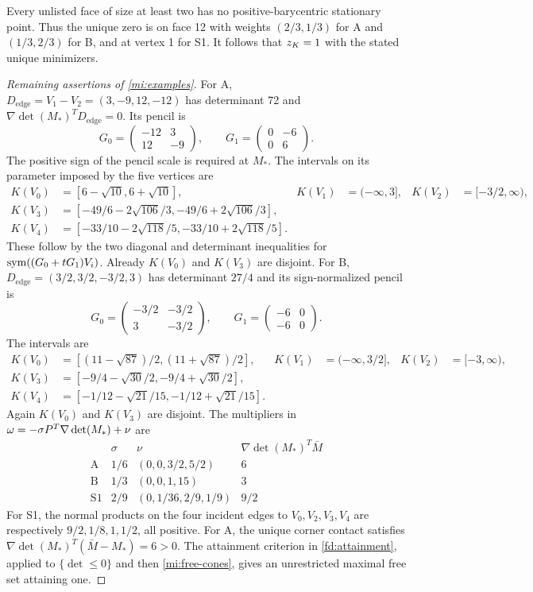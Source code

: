Every unlisted face of size at least two has no positive-barycentric
stationary point. Thus the unique zero is on face 12 with weights
$(2/3,1/3)$ for A and $(1/3,2/3)$ for B, and at vertex 1 for S1.
It follows that $z_K=1$ with the stated unique minimizers.

\begin{proof}[Remaining assertions of \cref{mi:examples}]\label{mi:example-proof}
For A, $D_{\mathrm{edge}}=V_1-V_2=(3,-9,12,-12)$ has determinant 72 and
$\nabla\det(M_*)^TD_{\mathrm{edge}}=0$. Its pencil is
\[
 G_0=\begin{pmatrix}-12&3\\12&-9\end{pmatrix},\qquad
 G_1=\begin{pmatrix}0&-6\\0&6\end{pmatrix}.
\]
The positive sign of the pencil scale is required at $M_*$.
The intervals on its parameter imposed by the five vertices are
\begin{align*}
 K(V_0)&=[6-\sqrt{10},6+\sqrt{10}],&
 K(V_1)&=(-\infty,3],&K(V_2)&=[-3/2,\infty),\\
 K(V_3)&=[-49/6-2\sqrt{106}/3,-49/6+2\sqrt{106}/3],\\
 K(V_4)&=[-33/10-2\sqrt{118}/5,-33/10+2\sqrt{118}/5].
\end{align*}
These follow by the two diagonal and determinant inequalities for
$\operatorname{sym}((G_0+tG_1)V_i)$. Already $K(V_0)$ and $K(V_3)$ are disjoint.
For B, $D_{\mathrm{edge}}=(3/2,3/2,-3/2,3)$ has determinant $27/4$ and its sign-normalized
pencil is
\[
 G_0=\begin{pmatrix}-3/2&-3/2\\3&-3/2\end{pmatrix},\qquad
 G_1=\begin{pmatrix}-6&0\\-6&0\end{pmatrix}.
\]
The intervals are
\begin{align*}
 K(V_0)&=[(11-\sqrt{87})/2,(11+\sqrt{87})/2],&
 K(V_1)&=(-\infty,3/2],&K(V_2)&=[-3,\infty),\\
 K(V_3)&=[-9/4-\sqrt{30}/2,-9/4+\sqrt{30}/2],\\
 K(V_4)&=[-1/12-\sqrt{21}/15,-1/12+\sqrt{21}/15].
\end{align*}
Again $K(V_0)$ and $K(V_3)$ are disjoint.
The multipliers in $\omega=-\sigma P^T\nabla\det(M_*)+\nu$ are
\[
\begin{array}{c|c|c|c}
 &\sigma&\nu&\nabla\det(M_*)^T\bar M\\\hline
\mathrm A&1/6&(0,0,3/2,5/2)&6\\
\mathrm B&1/3&(0,0,1,15)&3\\
\mathrm{S1}&2/9&(0,1/36,2/9,1/9)&9/2
\end{array}
\]
For S1, the normal products on the four incident edges to
$V_0,V_2,V_3,V_4$ are respectively $9/2,1/8,1,1/2$, all positive.
For A, the unique corner contact satisfies
$\nabla\det(M_*)^T(\bar M-M_*)=6>0$.
The attainment criterion in \cref{fd:attainment}, applied to
$\{\det\le0\}$ and then \cref{mi:free-cones}, gives an unrestricted
maximal free set attaining one.


\end{proof}
